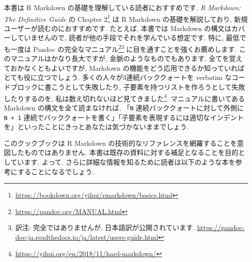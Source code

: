 \documentclass[
  11pt,
]{bxjsreport}
\renewcommand{\href}[2]{#2\footnote{\url{#1}}}
\begin{document}
本書は R Markdown の基礎を理解している読者におすすめです. \emph{R Markdown: The Definitive Guide} \autocite{rmarkdown2018} の \href{https://bookdown.org/yihui/rmarkdown/basics.html}{Chapter 2} は R Markdown の基礎を解説しており, 新規ユーザーが読むのにおすすめです. たとえば, 本書では Markdown の構文はカバーしていませんので, 読者が他の手段でそれを学んでいる想定です. 特に, 最低でも一度は \href{https://pandoc.org/MANUAL.html}{Pandoc の完全なマニュアル}\footnote{訳注: 完全ではありませんが, 日本語訳が公開されています. \url{https://pandoc-doc-ja.readthedocs.io/ja/latest/users-guide.html}} に目を通すことを強くお薦めします. このマニュアルはかなり長大ですが, 金脈のようなものでもあります. 全てを覚えておかなくともよいですが, Markdown の機能をどう応用できるか知っていればとても役に立つでしょう. 多くの人々が3連続バッククォートを verbatim なコードブロックに書こうとして失敗したり, 子要素を持つリストを作ろうとして失敗したりするのを, \href{https://yihui.org/en/2018/11/hard-markdown/}{私は数え切れないほど見てきました}. マニュアルに書いてある Markdown の構文を全て読まなければ, 「\texttt{N} 連続バッククォートに対して外側に \texttt{N + 1} 連続でバッククォートを書く」「子要素を表現するには適切なインデントを」といったことにきっとあなたは気づかないままでしょう.

このクックブックは R Markdown の技術的なリファレンスを網羅することを意図したものではありません. 本書は既存の資料に対する補足となることを目的としています. よって, さらに詳細な情報を知るために読者は以下のような本を参考にすることになるでしょう.
\end{document}
